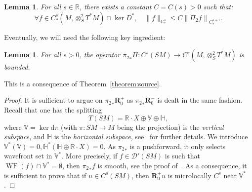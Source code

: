 \documentclass[10pt]{amsart}
\newtheorem{lemm}[theo]{Lemma}\newtheorem{prop}[theo]{Proposition}\newtheorem{coro}[theo]{Corollary}\newtheorem{conj}[theo]{Conjecture}
\theoremstyle{definition}\newtheorem{defi}[theo]{Definition}\newtheorem{rema}[theo]{Remark}\newtheorem{exam}[theo]{Example}\newtheorem{exem}[theo]{Example}\newtheorem{nota}[theo]{Notation}
\newcommand{\R}{\mathbb{R}}
\newcommand{\RR}{\mathbf{R}}
\newcommand{\V}{\mathbb{V}}
\newcommand{\HH}{\mathbb{H}}
\newcommand{\mc}{\mathcal}
\newcommand{\dd}{\mathrm{d}}
\DeclareMathOperator{\WF}{WF}
\let\oldforall\forall
\renewcommand*{\forall}{\mathrel{\oldforall}}
\begin{document}
\begin{lemm}\label{lemma:bound}
For all $s \in \R$, there exists a constant $C = C(s) > 0$ such that:
\[
\forall f \in C^s_*\left(M,\otimes^2_S T^*M\right) \cap \ker D^*,\quad\|f\|_{C^s_*} \leq C \left\|\Pi_2f\right\|_{C^{s+1}_*}.
\]
\end{lemm}

Eventually, we will need the following key ingredient:

\begin{lemm}\label{lemma:bound2}
For all $s > 0$, the operator ${\pi_2}_* \Pi : C^s(SM) \rightarrow C^s(M, \otimes^2_S T^*M)$ is bounded.
\end{lemm}

This is a consequence of Theorem~\ref{theorem:source}.

\begin{proof}
It is sufficient to argue on ${\pi_2}_* \RR_0^+$ as ${\pi_2}_* \RR_0^-$ is dealt in the same fashion. Recall that one has the splitting
\[
T(SM) = \R \cdot X \oplus \V \oplus \HH,
\]
where $\V = \ker \dd \pi$ (with $\pi : SM \rightarrow M$ being the projection) is the \emph{vertical subspace}, and $\HH$ is the \emph{horizontal subspace}, see~\cite{Paternain-99} for further details. We introduce $\V^*(\V)=0,\HH^*(\HH \oplus \R \cdot X) = 0$. As ${\pi_2}_*$ is a pushforward, it only selects wavefront set in $\V^*$. More precisely, if $f \in \mc{D}'(SM)$ is such that $\WF(f) \cap \V^* = \emptyset$, then ${\pi_2}_* f$ is smooth, see the proof of~\cite[Theorem~3.1]{Guillarmou-17-1}. As a consequence, it is sufficient to prove that if $u \in C^s(SM)$, then $\RR_0^+ u$ is microlocally $C^s$ near $\V^*$.


\end{proof}
\end{document}
